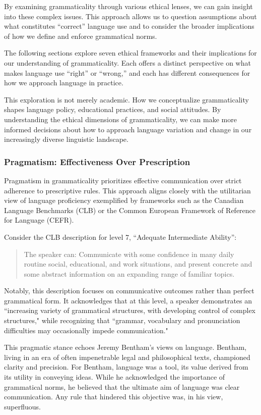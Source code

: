 By examining grammaticality through various ethical lenses, we can gain insight into these complex issues. This approach allows us to question assumptions about what constitutes ``correct'' language use and to consider the broader implications of how we define and enforce grammatical norms.

The following sections explore seven ethical frameworks and their implications for our understanding of grammaticality. Each offers a distinct perspective on what makes language use ``right'' or ``wrong,'' and each has different consequences for how we approach language in practice.

This exploration is not merely academic. How we conceptualize grammaticality shapes language policy, educational practices, and social attitudes. By understanding the ethical dimensions of grammaticality, we can make more informed decisions about how to approach language variation and change in our increasingly diverse linguistic landscape.

\subsubsection{Pragmatism: Effectiveness Over Prescription}

Pragmatism in grammaticality prioritizes effective communication over strict adherence to prescriptive rules. This approach aligns closely with the utilitarian view of language proficiency exemplified by frameworks such as the Canadian Language Benchmarks (CLB) or the Common European Framework of Reference for Language (CEFR).

Consider the CLB description for level 7, ``Adequate Intermediate Ability'':

\begin{quote}
The speaker can: Communicate with some confidence in many daily routine social, educational, and work situations, and present concrete and some abstract information on an expanding range of familiar topics.
\end{quote}

Notably, this description focuses on communicative outcomes rather than perfect grammatical form. It acknowledges that at this level, a speaker demonstrates an ``increasing variety of grammatical structures, with developing control of complex structures," while recognizing that ``grammar, vocabulary and pronunciation difficulties may occasionally impede communication."

This pragmatic stance echoes Jeremy Bentham's views on language. Bentham, living in an era of often impenetrable legal and philosophical texts, championed clarity and precision. For Bentham, language was a tool, its value derived from its utility in conveying ideas. While he acknowledged the importance of grammatical norms, he believed that the ultimate aim of language was clear communication. Any rule that hindered this objective was, in his view, superfluous.

